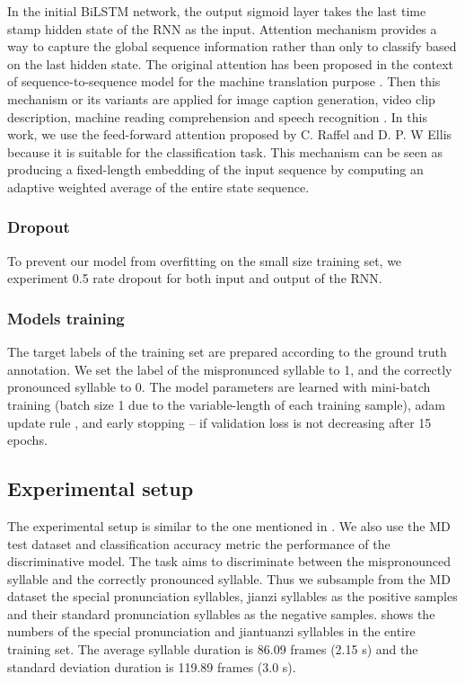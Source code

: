 In the initial BiLSTM network, the output sigmoid layer takes the last time stamp hidden state of the RNN as the input. Attention mechanism provides a way to capture the global sequence information rather than only to classify based on the last hidden state. The original attention has been proposed in the context of sequence-to-sequence model for the machine translation purpose \cite{Bahdanau2014}. Then this mechanism or its variants are applied for image caption generation, video clip description, machine reading comprehension and speech recognition \cite{Cho2015,Xu2015,Hermann2015}. In this work, we use the feed-forward attention proposed by C. Raffel and D. P. W Ellis \cite{Raffel2015} because it is suitable for the classification task. This mechanism can be seen as producing a fixed-length embedding of the input sequence by computing an adaptive
weighted average of the entire state sequence.

\subsubsection{Dropout}

To prevent our model from overfitting on the small size training set, we experiment 0.5 rate dropout for both input and output of the RNN.

\subsubsection{Models training}

The target labels of the training set are prepared according to the ground truth annotation. We set the label of the mispronunced syllable to 1, and the correctly pronounced syllable to 0. The model parameters are learned with mini-batch training (batch size 1 due to the variable-length of each training sample), adam update rule \cite{kingma2014adam}, and early stopping -- if validation loss is not decreasing after 15 epochs. 

\subsection{Experimental setup}\label{sec:ch6:experimental_setup}

The experimental setup is similar to the one mentioned in . We also use the MD test dataset and classification accuracy metric the performance of the discriminative model. The task aims to discriminate between the mispronounced syllable and the correctly pronounced syllable. Thus we subsample from the MD dataset the special pronunciation syllables, jianzi syllables as the positive samples and their standard pronunciation syllables as the negative samples.  shows the numbers of the special pronunciation and jiantuanzi syllables in the entire training set. The average syllable duration is 86.09 frames (2.15 s) and the standard deviation duration is 119.89 frames (3.0 s). 

